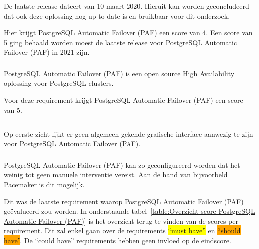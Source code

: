 De laatste release dateert van 10 maart 2020. Hieruit kan worden geconcludeerd dat ook deze oplossing nog up-to-date is en bruikbaar voor dit onderzoek. 

Hier krijgt PostgreSQL Automatic Failover (PAF) een score van 4. Een score van 5 ging behaald worden moest de laatste release voor PostgreSQL Automatic Failover (PAF) in 2021 zijn.

\subsubsection{}
\label{subsubsec:Open source}

PostgreSQL Automatic Failover (PAF) is een open source High Availability oplossing voor PostgreSQL clusters.

Voor deze requirement krijgt PostgreSQL Automatic Failover (PAF) een score van 5.

\subsection{}
\label{subsec:Could have}

\subsubsection{}
\label{subsubsec:Grafische interface}

Op eerste zicht lijkt er geen algemeen gekende grafische interface aanwezig te zijn voor PostgreSQL Automatic Failover (PAF).

\subsubsection{}
\label{subsubsec:Beperkte manuele interventie}

PostgreSQL Automatic Failover (PAF) kan zo geconfigureerd worden dat het weinig tot geen manuele interventie vereist. Aan de hand van bijvoorbeld Pacemaker is dit mogelijk.

Dit was de laatste requirement waarop PostgreSQL Automatic Failover (PAF) geëvalueerd zou worden. In onderstaande tabel~\ref{table:Overzicht score PostgreSQL Automatic Failover (PAF)} is het overzicht terug te vinden van de scores per requirement. Dit zal enkel gaan over de requirements \colorbox{yellow}{“must have”} en \colorbox{orange}{“should have”}. De “could have” requirements hebben geen invloed op de eindscore.



